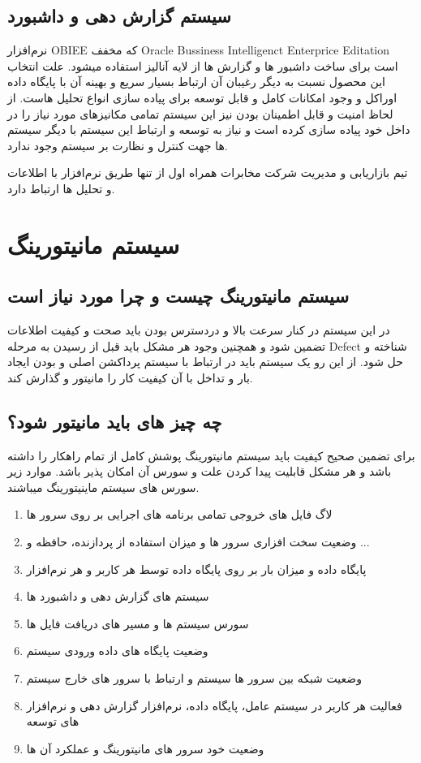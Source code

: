 \documentclass{llncs}
\begin{document}
\subsection{سیستم گزارش دهی و داشبورد}
نرم‌افزار OBIEE که مخفف Oracle Bussiness Intelligenct Enterprice Editation است برای ساخت داشبور ها و گزارش ها از لایه آنالیز استفاده میشود.
علت انتخاب این محصول نسبت به دیگر رغیبان آن ارتباط بسیار سریع و بهینه آن با پایگاه داده اوراکل و وجود امکانات کامل و قابل توسعه برای پیاده سازی انواع تحلیل هاست.
از لحاظ امنیت و قابل اطمینان بودن نیز این سیستم تمامی مکانیزهای مورد نیاز را در داخل خود پیاده سازی کرده است و نیاز به توسعه و ارتباط این سیستم با دیگر سیستم ها جهت کنترل و نظارت بر سیستم وجود ندارد.

تیم بازاریابی و مدیریت شرکت مخابرات همراه اول از تنها طریق نرم‌افزار با اطلاعات و تحلیل ها ارتباط دارد.

\newpage

\section{سیستم مانیتورینگ}
\subsection{سیستم مانیتورینگ چیست و چرا مورد نیاز است}
در این سیستم در کنار سرعت بالا و دردسترس بودن باید صحت و کیفیت اطلاعات تضمین شود و همچنین وجود هر مشکل باید قبل از رسیدن به مرحله Defect شناخته و حل شود.
از این رو یک سیستم باید در ارتباط با سیستم پرداکشن اصلی و بودن ایجاد بار و تداخل با آن کیفیت کار را مانیتور و گذارش کند.


\subsection{چه چیز های باید مانیتور شود؟}
برای تضمین صحیح کیفیت باید سیستم مانیتورینگ پوشش کامل از تمام راهکار را داشته باشد و هر مشکل قابلیت پیدا کردن علت و سورس آن امکان پذیر باشد.
موارد زیر سورس های سیستم ماینیتورینگ میباشند.
\begin{enumerate}
    \item لاگ فایل های خروجی تمامی برنامه های اجرایی بر روی سرور ها
    \item وضعیت سخت افزاری سرور ها و میزان استفاده از پردازنده، حافظه و ...
    \item پایگاه داده و میزان بار بر روی پایگاه داده توسط هر کاربر و هر نرم‌افزار
    \item سیستم های گزارش دهی و داشبورد ها
    \item سورس سیستم ها و مسیر های دریافت فایل ها
    \item وضعیت پایگاه های داده ورودی سیستم
    \item وضعیت شبکه بین سرور ها سیستم و ارتباط با سرور های خارج سیستم
    \item فعالیت هر کاربر در سیستم عامل، پایگاه داده، نرم‌افزار گزارش دهی و نرم‌افزار های توسعه
    \item وضعیت خود سرور های مانیتورینگ و عملکرد آن ها
\end{enumerate}
\end{document}
